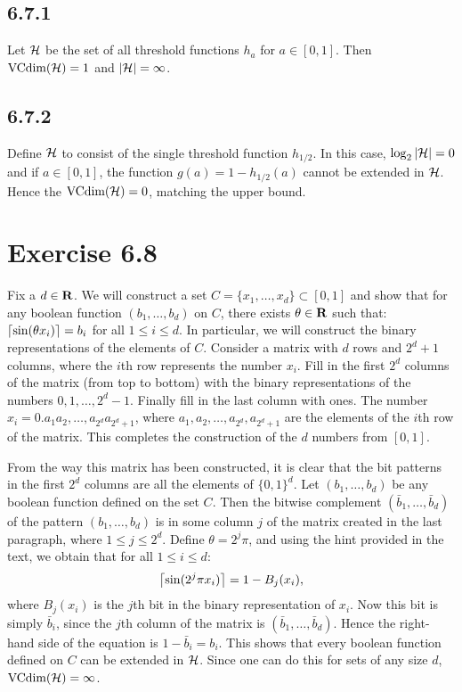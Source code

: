 \subsection*{6.7.1} Let $\mathcal{H}$ be the set of all threshold functions $h_a$
for $a \in [0, 1]$. Then $\text{VCdim} (\mathcal{H}) = 1$ and  $|\mathcal{H}| = \infty$.

\subsection*{6.7.2} Define $\mathcal{H}$ to consist of the single threshold function
$h_{1/2}$. In this case, $\log_2 |\mathcal{H}| = 0$ and if $a \in [0, 1]$, the 
function $g(a) = 1 - h_{1/2}(a)$ cannot be extended in $\mathcal{H}$. Hence the 
$\text{VCdim} (\mathcal{H}) = 0$, matching the upper bound.
  
  
\section*{Exercise 6.8}

Fix a $d \in \mathbf{R}$. We will construct a set $C = \{x_1, 
\ldots, x_d\} \subset [0, 1]$ and show that for any boolean function $(b_1, \ldots, b_d)$ 
on $C$, there exists $\theta \in \mathbf{R}$ such that: $\left \lceil \sin (\theta x_i)  \right \rceil = b_i$ 
for all $1 \leq i \leq d$. In particular, we will construct the binary representations
of the elements of $C$. Consider a matrix with $d$ rows and $2^d + 1$ columns, where 
the $i$th row represents the number $x_i$. Fill in the first $2^d$ columns of the matrix
(from top to bottom) with the binary representations of the numbers $0, 1, \ldots, 2^d - 1$.
Finally fill in the last column with ones. The number $x_i = 0.a_1a_2, \ldots, 
a_{2^d}a_{2^d + 1}$, where $a_1, a_2, \ldots, a_{2^d}, a_{2^d + 1}$ are the elements
of the $i$th row of the matrix. This completes the construction of the $d$ numbers from 
$[0, 1]$.

From the way this matrix has been constructed, it is clear that the bit patterns in the 
first $2^d$ columns are all the elements of $\{0, 1\}^d$. Let $(b_1, \ldots, b_d)$ be any 
boolean function defined on the set $C$. Then the bitwise complement $(\bar{b}_1, \ldots, 
\bar{b}_d)$ of the pattern $(b_1, \ldots, b_d)$ is in some column $j$ of the matrix 
created in the last paragraph, where $1 \leq j \leq 2^d$. Define $\theta = 2^j \pi$, and
using the hint provided in the text, we obtain that  for all $1 \leq i \leq d$:
\[
    \left \lceil \sin(2^j \pi x_i) \right \rceil = 1 - B_j(x_i),  
\]  
where $B_j(x_i)$ is the $j$th bit in the binary representation of $x_i$. Now this bit is 
simply $\bar{b}_i$, since the $j$th column of the matrix is $(\bar{b}_1, \ldots, 
\bar{b}_d)$. Hence the right-hand side of the equation is $1 - \bar{b}_i = b_i$. 
This shows that every boolean function defined on $C$ can be extended in $\mathcal{H}$. Since
one can do this for sets of any size $d$, $\text{VCdim} (\mathcal{H}) = \infty$. 
 

